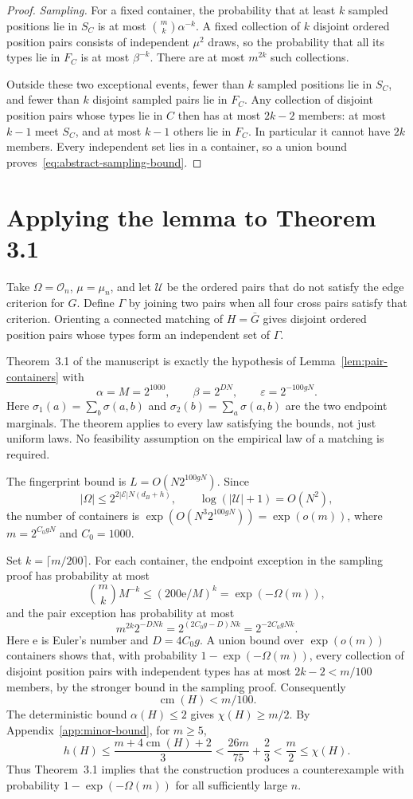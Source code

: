 \documentclass[11pt]{article}
\newcommand{\cm}{\operatorname{cm}}
\begin{document}
\begin{proof}
\emph{Sampling.}
For a fixed container, the probability that at least $k$ sampled positions lie in $S_C$ is at most $\binom{m}{k}\alpha^{-k}$. A fixed collection of $k$ disjoint ordered position pairs consists of independent $\mu^2$ draws, so the probability that all its types lie in $F_C$ is at most $\beta^{-k}$. There are at most $m^{2k}$ such collections.

Outside these two exceptional events, fewer than $k$ sampled positions lie in $S_C$, and fewer than $k$ disjoint sampled pairs lie in $F_C$. Any collection of disjoint position pairs whose types lie in $C$ then has at most $2k-2$ members: at most $k-1$ meet $S_C$, and at most $k-1$ others lie in $F_C$. In particular it cannot have $2k$ members. Every independent set lies in a container, so a union bound proves~\eqref{eq:abstract-sampling-bound}.
\end{proof}

\section{Applying the lemma to Theorem 3.1}
\label{sec:containers}
Take $\Omega=\mathcal O_n$, $\mu=\mu_n$, and let $\mathcal U$ be the ordered pairs that do not satisfy the edge criterion for $G$. Define $\Gamma$ by joining two pairs when all four cross pairs satisfy that criterion. Orienting a connected matching of $H=\bar G$ gives disjoint ordered position pairs whose types form an independent set of $\Gamma$.

Theorem~3.1 of the manuscript is exactly the hypothesis of Lemma~\ref{lem:pair-containers} with
\[
\alpha=M=2^{1000},\qquad \beta=2^{DN},\qquad
\varepsilon=2^{-100gN}.
\]
Here $\sigma_1(a)=\sum_b\sigma(a,b)$ and $\sigma_2(b)=\sum_a\sigma(a,b)$ are the two endpoint marginals. The theorem applies to every law satisfying the bounds, not just uniform laws. No feasibility assumption on the empirical law of a matching is required.

The fingerprint bound is $L=O(N2^{100gN})$. Since
\[
|\Omega|\le2^{2|\mathcal E|N(d_B+h)},\qquad
\log(|\mathcal U|+1)=O(N^2),
\]
the number of containers is $\exp(O(N^3 2^{100gN}))=\exp(o(m))$, where $m=2^{C_0gN}$ and $C_0=1000$.

Set $k=\lceil m/200\rceil$. For each container, the endpoint exception in the sampling proof has probability at most
\[
\binom{m}{k}M^{-k}\le(200\mathrm e/M)^k=\exp(-\Omega(m)),
\]
and the pair exception has probability at most
\[
m^{2k}2^{-DNk}=2^{(2C_0g-D)Nk}=2^{-2C_0gNk}.
\]
Here $\mathrm e$ is Euler's number and $D=4C_0g$. A union bound over $\exp(o(m))$ containers shows that, with probability $1-\exp(-\Omega(m))$, every collection of disjoint position pairs with independent types has at most $2k-2<m/100$ members, by the stronger bound in the sampling proof. Consequently
\[
\cm(H)<m/100.
\]
The deterministic bound $\alpha(H)\le2$ gives $\chi(H)\ge m/2$. By Appendix~\ref{app:minor-bound}, for $m\ge5$,
\[
h(H)\le\frac{m+4\cm(H)+2}{3}
<\frac{26m}{75}+\frac23
<\frac m2\le\chi(H).
\]
Thus Theorem~3.1 implies that the construction produces a counterexample with probability $1-\exp(-\Omega(m))$ for all sufficiently large $n$.
\end{document}
